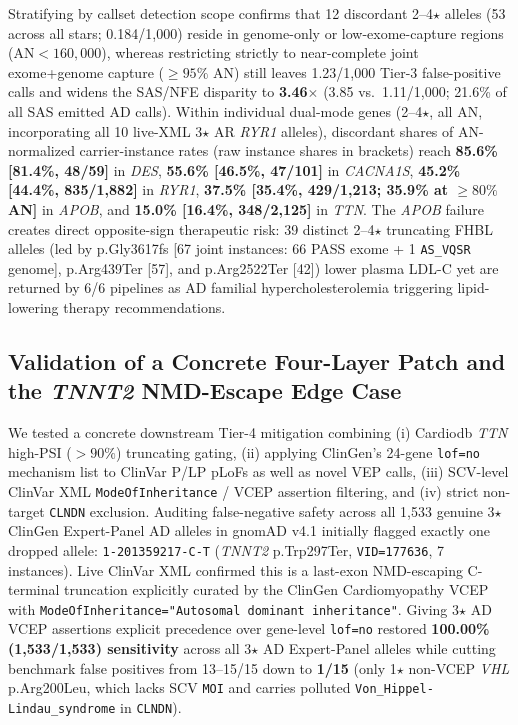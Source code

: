 \documentclass[11pt,letterpaper]{article}
\begin{document}
Stratifying by callset detection scope confirms that 12 discordant 2--4$\star$ alleles (53 across all stars; 0.184/1,000) reside in genome-only or low-exome-capture regions ($\text{AN}<160{,}000$), whereas restricting strictly to near-complete joint exome+genome capture ($\ge 95\%$ AN) still leaves 1.23/1,000 Tier-3 false-positive calls and widens the SAS/NFE disparity to \textbf{3.46$\times$} (3.85 vs.\ 1.11/1,000; 21.6\% of all SAS emitted AD calls). Within individual dual-mode genes (2--4$\star$, all AN, incorporating all 10 live-XML 3$\star$ AR \textit{RYR1} alleles), discordant shares of AN-normalized carrier-instance rates (raw instance shares in brackets) reach \textbf{85.6\% [81.4\%, 48/59]} in \textit{DES}, \textbf{55.6\% [46.5\%, 47/101]} in \textit{CACNA1S}, \textbf{45.2\% [44.4\%, 835/1,882]} in \textit{RYR1}, \textbf{37.5\% [35.4\%, 429/1,213; 35.9\% at $\ge 80\%$ AN]} in \textit{APOB}, and \textbf{15.0\% [16.4\%, 348/2,125]} in \textit{TTN}. The \textit{APOB} failure creates direct opposite-sign therapeutic risk: 39 distinct 2--4$\star$ truncating FHBL alleles (led by p.Gly3617fs [67 joint instances: 66 PASS exome + 1 \texttt{AS\_VQSR} genome], p.Arg439Ter [57], and p.Arg2522Ter [42]) lower plasma LDL-C yet are returned by 6/6 pipelines as AD familial hypercholesterolemia triggering lipid-lowering therapy recommendations.

\subsection{Validation of a Concrete Four-Layer Patch and the \textit{TNNT2} NMD-Escape Edge Case}
We tested a concrete downstream Tier-4 mitigation combining (i) Cardiodb \textit{TTN} high-PSI ($>90\%$) truncating gating, (ii) applying ClinGen's 24-gene \texttt{lof=no} mechanism list to ClinVar P/LP pLoFs as well as novel VEP calls, (iii) SCV-level ClinVar XML \texttt{ModeOfInheritance} / VCEP assertion filtering, and (iv) strict non-target \texttt{CLNDN} exclusion. Auditing false-negative safety across all 1,533 genuine 3$\star$ ClinGen Expert-Panel AD alleles in gnomAD v4.1 initially flagged exactly one dropped allele: \texttt{1-201359217-C-T} (\textit{TNNT2} p.Trp297Ter, \texttt{VID=177636}, 7 instances). Live ClinVar XML confirmed this is a last-exon NMD-escaping C-terminal truncation explicitly curated by the ClinGen Cardiomyopathy VCEP with \texttt{ModeOfInheritance="Autosomal dominant inheritance"}. Giving 3$\star$ AD VCEP assertions explicit precedence over gene-level \texttt{lof=no} restored \textbf{100.00\% (1,533/1,533) sensitivity} across all 3$\star$ AD Expert-Panel alleles while cutting benchmark false positives from 13--15/15 down to \textbf{1/15} (only 1$\star$ non-VCEP \textit{VHL} p.Arg200Leu, which lacks SCV \texttt{MOI} and carries polluted \texttt{Von\_\allowbreak Hippel-Lindau\_\allowbreak syndrome} in \texttt{CLNDN}).
\end{document}
